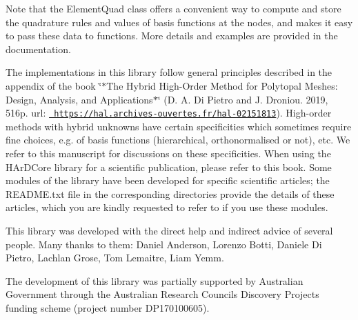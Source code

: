 Note that the {\ttfamily Element\+Quad} class offers a convenient way to compute and store the quadrature rules and values of basis functions at the nodes, and makes it easy to pass these data to functions. More details and examples are provided in the documentation.

The implementations in this library follow general principles described in the appendix of the book \char`\"{}$\ast$\+The Hybrid High-\/\+Order Method for Polytopal Meshes\+: Design, Analysis, and Applications$\ast$\char`\"{} (D. A. Di Pietro and J. Droniou. 2019, 516p. url\+: \href{https://hal.archives-ouvertes.fr/hal-02151813}{\texttt{ https\+://hal.\+archives-\/ouvertes.\+fr/hal-\/02151813}}). High-\/order methods with hybrid unknowns have certain specificities which sometimes require fine choices, e.\+g. of basis functions (hierarchical, orthonormalised or not), etc. We refer to this manuscript for discussions on these specificities. When using the HAr\+DCore library for a scientific publication, please refer to this book. Some modules of the library have been developed for specific scientific articles; the README.\+txt file in the corresponding directories provide the details of these articles, which you are kindly requested to refer to if you use these modules.

This library was developed with the direct help and indirect advice of several people. Many thanks to them\+: Daniel Anderson, Lorenzo Botti, Daniele Di Pietro, Lachlan Grose, Tom Lemaitre, Liam Yemm.

The development of this library was partially supported by Australian Government through the Australian Research Council\textquotesingle{}s Discovery Projects funding scheme (project number DP170100605). 